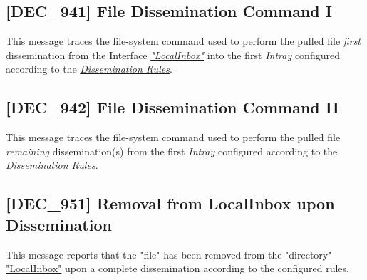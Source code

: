 \documentclass[dec_sum_main.tex]{subfiles}
\begin{document}
\subsection{[DEC\_941] File Dissemination Command I}
\label{DEC941}
This message traces the file-system command used to perform the pulled file \textit{first} dissemination from the Interface \hyperref[LocalInbox]{\textit{"LocalInbox"}} into the first \textit{Intray} configured according to the \hyperref[Dissemination rules]{\textit{Dissemination Rules}}.

\subsection{[DEC\_942] File Dissemination Command II}
\label{DEC942}
This message traces the file-system command used to perform the pulled file \textit{remaining} dissemination(s) from the first \textit{Intray} configured according to the \hyperref[Dissemination rules]{\textit{Dissemination Rules}}.

\subsection{[DEC\_951] Removal from LocalInbox upon Dissemination}
\label{DEC951}
This message reports that the "file" has been removed from the "directory" \hyperref[LocalInbox]{"LocalInbox"} upon a complete dissemination according to the configured rules.
\end{document}
